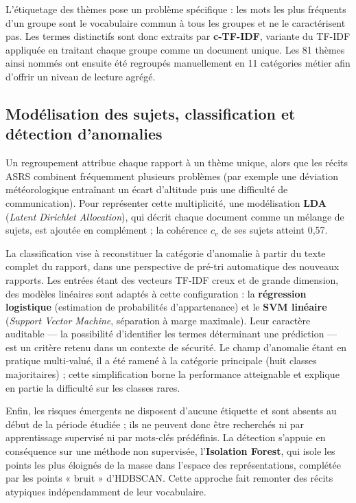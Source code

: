 \documentclass[11pt,a4paper]{article}
\begin{document}
L'étiquetage des thèmes pose un problème spécifique : les mots les plus fréquents d'un groupe
sont le vocabulaire commun à tous les groupes et ne le caractérisent pas. Les termes
distinctifs sont donc extraits par \textbf{c-TF-IDF}, variante du TF-IDF appliquée en traitant
chaque groupe comme un document unique. Les 81 thèmes ainsi nommés ont ensuite été regroupés
manuellement en 11 catégories métier afin d'offrir un niveau de lecture agrégé.

\subsection{Modélisation des sujets, classification et détection d'anomalies}
Un regroupement attribue chaque rapport à un thème unique, alors que les récits ASRS
combinent fréquemment plusieurs problèmes (par exemple une déviation météorologique
entraînant un écart d'altitude puis une difficulté de communication). Pour représenter cette
multiplicité, une modélisation \textbf{LDA} (\emph{Latent Dirichlet Allocation}), qui décrit
chaque document comme un mélange de sujets, est ajoutée en complément ; la cohérence $c_v$ de
ses sujets atteint 0,57.

La classification vise à reconstituer la catégorie d'anomalie à partir du texte complet du
rapport, dans une perspective de pré-tri automatique des nouveaux rapports. Les entrées étant
des vecteurs TF-IDF creux et de grande dimension, des modèles linéaires sont adaptés à cette
configuration : la \textbf{régression logistique} (estimation de probabilités d'appartenance)
et le \textbf{SVM linéaire} (\emph{Support Vector Machine}, séparation à marge maximale). Leur
caractère auditable — la possibilité d'identifier les termes déterminant une prédiction — est
un critère retenu dans un contexte de sécurité. Le champ d'anomalie étant en pratique
multi-valué, il a été ramené à la catégorie principale (huit classes majoritaires) ; cette
simplification borne la performance atteignable et explique en partie la difficulté sur les
classes rares.

Enfin, les risques émergents ne disposent d'aucune étiquette et sont absents au début de la
période étudiée ; ils ne peuvent donc être recherchés ni par apprentissage supervisé ni par
mots-clés prédéfinis. La détection s'appuie en conséquence sur une méthode non supervisée,
l'\textbf{Isolation Forest}, qui isole les points les plus éloignés de la masse dans l'espace
des représentations, complétée par les points « bruit » d'HDBSCAN. Cette approche fait
remonter des récits atypiques indépendamment de leur vocabulaire.
\end{document}
